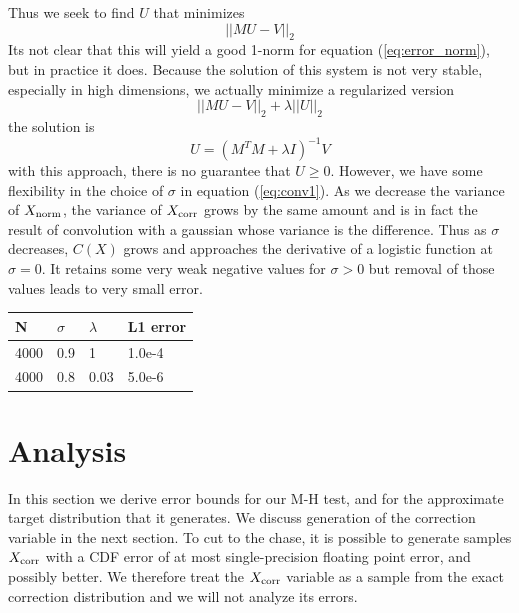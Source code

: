 \documentclass{article}
\begin{document}
Thus we seek to find $U$ that minimizes
\begin{equation}
  ||MU-V||_2
\end{equation}
Its not clear that this will yield a good 1-norm for equation (\ref{eq:error_norm}), but in practice it does.
Because the solution of this system is not very stable, especially in high dimensions, we actually
minimize a regularized version
\begin{equation}
  ||MU-V||_2 + \lambda||U||_2
\end{equation}
the solution is
\begin{equation}
  U = (M^T M + \lambda I)^{-1}V
\end{equation}
with this approach, there is no guarantee that $U \geq 0$. However, we have some
flexibility in the choice of $\sigma$ in equation (\ref{eq:conv1}). As we decrease
the variance of $X_{\rm norm}$, the variance of $X_{\rm corr}$ grows by the same amount
and is in fact the result of convolution with a gaussian whose variance is the difference.
Thus as $\sigma$ decreases, $C(X)$ grows and approaches the derivative of a
logistic function at $\sigma = 0$. It retains some very weak negative values for $\sigma > 0$
but removal of those values leads to very small error.
\begin{table}[h]
  \centering
  \begin{tabular}{|l|l|l|l|}
    \hline
     N & $\sigma$ & $\lambda$ & L1 error  \\
        \hline
     4000 & 0.9 & 1 & 1.0e-4  \\
     4000 & 0.8 & 0.03 & 5.0e-6 \\
     \hline
    \end{tabular}
\end{table}





\section{Analysis}\label{sec:analysis}

In this section we derive error bounds for our M-H test, and for the approximate target
distribution that it generates. We discuss generation of the correction variable in the
next section. To cut to the chase, it is possible to generate samples $X_{\rm corr}$ with
a CDF error of at most single-precision floating point error, and possibly better. We
therefore treat the $X_{\rm corr}$ variable as a sample from the exact correction distribution
and we will not analyze its errors.
\end{document}
